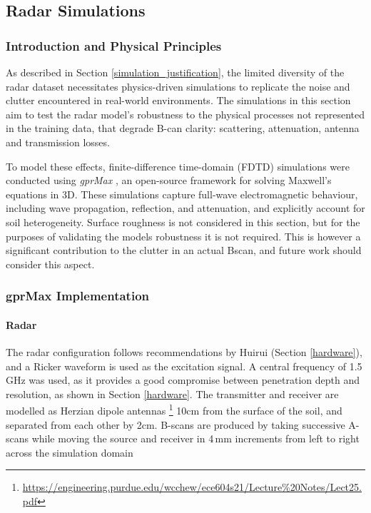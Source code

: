 \subsection{Radar Simulations} \label{compvis_radarsims}

    \subsubsection{Introduction and Physical Principles} \label{rory_radar_principles}
    
        \noindent As described in Section \ref{simulation_justification}, the limited diversity of the radar dataset necessitates physics-driven simulations to replicate the noise and clutter encountered in real-world environments. The simulations in this section aim to test the radar model's robustness to the physical processes not represented in the training data, that degrade B-can clarity: scattering, attenuation, antenna and transmission losses.
        
        \noindent To model these effects, finite-difference time-domain (FDTD) simulations were conducted using \textit{gprMax} \cite{warren2016gprmax}, an open-source framework for solving Maxwell’s equations in 3D. These simulations capture full-wave electromagnetic behaviour, including wave propagation, reflection, and attenuation, and explicitly account for soil heterogeneity. Surface roughness is not considered in this section, but for the purposes of validating the models robustness it is not required. This is however a significant contribution to the clutter in an actual Bscan, and future work should consider this aspect.
     
    
    \subsubsection{gprMax Implementation}

        \paragraph{Radar}
        
             \noindent The radar configuration follows recommendations by Huirui (Section \ref{hardware}), and a Ricker waveform is used as the excitation signal. A central frequency of 1.5\,GHz was used, as it provides a good compromise between penetration depth and resolution, as shown in Section \ref{hardware}. The transmitter and receiver are modelled as Herzian dipole antennas \footnote{\url{https://engineering.purdue.edu/wcchew/ece604s21/Lecture\%20Notes/Lect25.pdf}} 10cm from the surface of the soil, and separated from each other by 2cm. B-scans are produced by taking successive A-scans while moving the source and receiver in 4\,mm increments from left to right across the simulation domain
    
